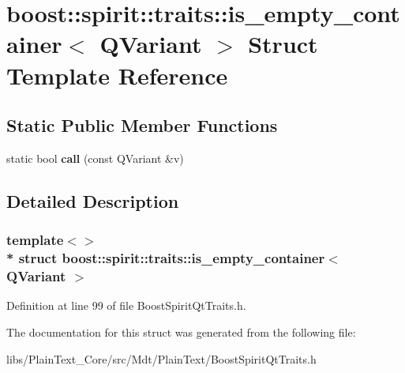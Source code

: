 \hypertarget{structboost_1_1spirit_1_1traits_1_1is__empty__container_3_01_q_variant_01_4}{}\section{boost\+:\+:spirit\+:\+:traits\+:\+:is\+\_\+empty\+\_\+container$<$ Q\+Variant $>$ Struct Template Reference}
\label{structboost_1_1spirit_1_1traits_1_1is__empty__container_3_01_q_variant_01_4}
\subsection*{Static Public Member Functions}
\begin{DoxyCompactItemize}
\item 
static bool {\bfseries call} (const Q\+Variant \&v)\hypertarget{structboost_1_1spirit_1_1traits_1_1is__empty__container_3_01_q_variant_01_4_a75cb0bc76409918b0064de10ae05cc3a}{}\label{structboost_1_1spirit_1_1traits_1_1is__empty__container_3_01_q_variant_01_4_a75cb0bc76409918b0064de10ae05cc3a}

\end{DoxyCompactItemize}


\subsection{Detailed Description}
\subsubsection*{template$<$$>$\\*
struct boost\+::spirit\+::traits\+::is\+\_\+empty\+\_\+container$<$ Q\+Variant $>$}



Definition at line 99 of file Boost\+Spirit\+Qt\+Traits.\+h.



The documentation for this struct was generated from the following file\+:\begin{DoxyCompactItemize}
\item 
libs/\+Plain\+Text\+\_\+\+Core/src/\+Mdt/\+Plain\+Text/Boost\+Spirit\+Qt\+Traits.\+h\end{DoxyCompactItemize}
